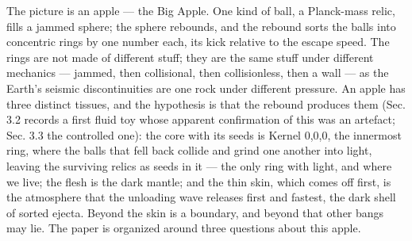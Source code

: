 \documentclass[
  11pt,
]{article}
\begin{document}
The picture is an apple --- the Big Apple. One kind of ball, a
Planck-mass relic, fills a jammed sphere; the sphere rebounds, and the
rebound sorts the balls into concentric rings by one number each, its
kick relative to the escape speed. The rings are not made of different
stuff; they are the same stuff under different mechanics --- jammed,
then collisional, then collisionless, then a wall --- as the Earth's
seismic discontinuities are one rock under different pressure. An apple
has three distinct tissues, and the hypothesis is that the rebound
produces them (Sec. 3.2 records a first fluid toy whose apparent
confirmation of this was an artefact; Sec. 3.3 the controlled one): the
core with its seeds is Kernel 0,0,0, the innermost ring, where the balls
that fell back collide and grind one another into light, leaving the
surviving relics as seeds in it --- the only ring with light, and where
we live; the flesh is the dark mantle; and the thin skin, which comes
off first, is the atmosphere that the unloading wave releases first and
fastest, the dark shell of sorted ejecta. Beyond the skin is a boundary,
and beyond that other bangs may lie. The paper is organized around three
questions about this apple.
\end{document}
